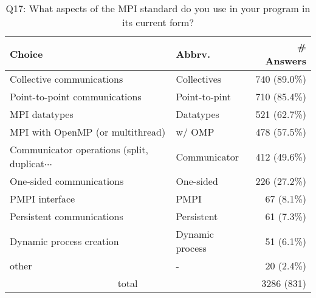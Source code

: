 \begin{table}[htb]%
\begin{center}%
\caption{Q17: What aspects of the MPI standard do you use in your program in its current form?}%
\label{tab:Q17-ans}%
\begin{tabular}{l|l|r}%
\hline%
Choice & Abbrv. & \# Answers \\%
\hline%
Collective communications & Collectives & 740 (89.0\%) \\%
Point-to-point communications & Point-to-pint & 710 (85.4\%) \\%
MPI datatypes & Datatypes & 521 (62.7\%) \\%
MPI with OpenMP (or multithread) & w/ OMP & 478 (57.5\%) \\%
{\small Communicator operations (split, duplicat$\cdots$} & Communicator & 412 (49.6\%) \\%
One-sided communications & One-sided & 226 (27.2\%) \\%
PMPI interface & PMPI & 67 (8.1\%) \\%
Persistent communications & Persistent & 61 (7.3\%) \\%
Dynamic process creation & Dynamic process & 51 (6.1\%) \\%
other & - & 20 (2.4\%) \\%
\hline%
\multicolumn{2}{c}{total} & 3286 (831)\\%
\hline%
\end{tabular}%
\end{center}%
\end{table}%
